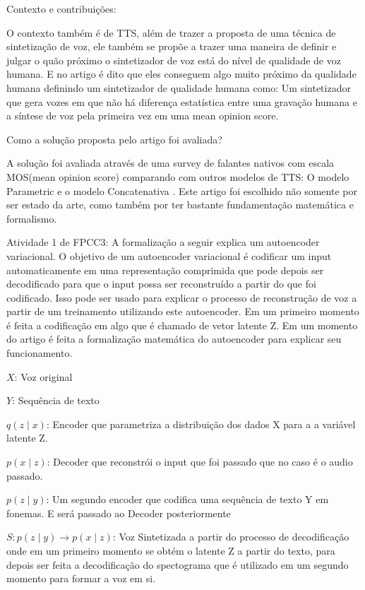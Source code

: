 \documentclass[a4paper,12pt]{article}
\begin{document}
			Contexto e contribuições:
						
			O contexto também é de TTS, além de trazer a proposta de uma técnica de sintetização de voz, ele também se propõe a trazer uma maneira de definir e julgar o quão próximo o sintetizador de voz está do nível de qualidade de voz humana. E no artigo é dito que eles conseguem algo muito próximo da qualidade humana definindo um sintetizador de qualidade humana como: Um sintetizador que gera vozes em que não há diferença estatística entre uma gravação humana e a síntese de voz pela primeira vez em uma mean opinion score.
			
			Como a solução proposta pelo artigo foi avaliada?
			
			A solução foi avaliada através de uma survey de falantes nativos com escala MOS(mean opinion score) comparando com outros modelos de TTS: O modelo Parametric \cite{zen2016parametric} e o modelo Concatenativa \cite{goncalvo2016concatenative}. Este artigo foi escolhido não somente por ser estado da arte, como também por ter bastante fundamentação matemática e formalismo.
			
			Atividade 1 de FPCC3: A formalização a seguir explica um autoencoder variacional. O objetivo de um autoencoder variacional é codificar um input automaticamente em uma representação comprimida que pode depois ser decodificado para que o input possa ser reconstruído a partir do que foi codificado. Isso pode ser usado para explicar o processo de reconstrução de voz a partir de um treinamento utilizando este autoencoder. Em um primeiro momento é feita a codificação em algo que é chamado de vetor latente Z. Em um momento do artigo é feita a formalização matemática do autoencoder para explicar seu funcionamento.

			$X$: Voz original
			
			$Y$: Sequência de texto
			
			$q(z \mid x)$: Encoder que parametriza a distribuição dos dados X para a a variável latente Z.
			
			$p(x \mid z)$: Decoder que reconstrói o input que foi passado que no caso é o audio passado.
				
			$p(z \mid y)$: Um segundo encoder que codifica uma sequência de texto Y em fonemas. E será passado ao Decoder posteriormente
			
			$S: p(z \mid y) \rightarrow  p(x \mid z)$: Voz Sintetizada a partir do processo de decodificação onde em um primeiro momento se obtém o latente Z a partir do texto, para depois ser feita a decodificação do spectograma que é utilizado em um segundo momento para formar a voz em si.
			
\end{document}
